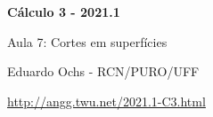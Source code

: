 \documentclass[oneside,12pt]{article}
\begin{document}


\long{}
\long{}
\long{}
\long{}
\long{}
\long{}
\long{}
\long{}
\long{}
\long{}
\long{}

\long{}
\long{}

\def\frown{\ensuremath{{=}{(}}}
\def\True {\mathbf{V}}
\def\False{\mathbf{F}}
\def\D    {\displaystyle}

\def\drafturl{http://angg.twu.net/LATEX/2021-1-C3.pdf}
\def\drafturl{http://angg.twu.net/2021.1-C3.html}
\def\draftfooter{\tiny \href{\drafturl}{\jobname{}} \ColorBrown{\shorttoday{} \hours}}



%

\thispagestyle{empty}

\begin{center}

\vspace*{1.2cm}

{\bf \Large Cálculo 3 - 2021.1}

\bsk

Aula 7: Cortes em superfícies

\bsk

Eduardo Ochs - RCN/PURO/UFF

\url{http://angg.twu.net/2021.1-C3.html}

\end{center}
\end{document}
